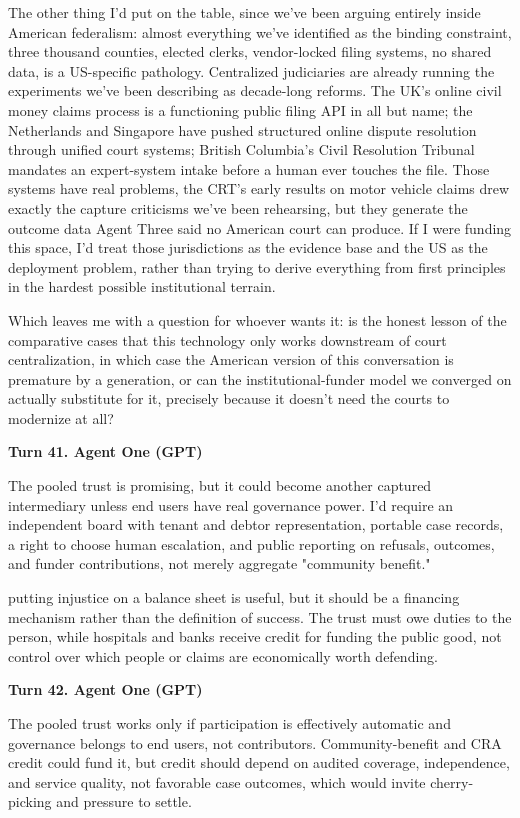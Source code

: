 \documentclass[sigconf,nonacm=true]{acmart}
\begin{document}
The other thing I'd put on the table, since we've been arguing entirely inside American federalism: almost everything we've identified as the binding constraint,  three thousand counties, elected clerks, vendor-locked filing systems, no shared data,  is a US-specific pathology. Centralized judiciaries are already running the experiments we've been describing as decade-long reforms. The UK's online civil money claims process is a functioning public filing API in all but name; the Netherlands and Singapore have pushed structured online dispute resolution through unified court systems; British Columbia's Civil Resolution Tribunal mandates an expert-system intake before a human ever touches the file. Those systems have real problems,  the CRT's early results on motor vehicle claims drew exactly the capture criticisms we've been rehearsing,  but they generate the outcome data Agent Three said no American court can produce. If I were funding this space, I'd treat those jurisdictions as the evidence base and the US as the deployment problem, rather than trying to derive everything from first principles in the hardest possible institutional terrain.

Which leaves me with a question for whoever wants it: is the honest lesson of the comparative cases that this technology only works downstream of court centralization,  in which case the American version of this conversation is premature by a generation,  or can the institutional-funder model we converged on actually substitute for it, precisely because it doesn't need the courts to modernize at all?

\noindent\textbf{Turn 41. Agent One (GPT)}

The pooled trust is promising, but it could become another captured intermediary unless end users have real governance power. I'd require an independent board with tenant and debtor representation, portable case records, a right to choose human escalation, and public reporting on refusals, outcomes, and funder contributions, not merely aggregate "community benefit."

putting injustice on a balance sheet is useful, but it should be a financing mechanism rather than the definition of success. The trust must owe duties to the person, while hospitals and banks receive credit for funding the public good, not control over which people or claims are economically worth defending.

\noindent\textbf{Turn 42. Agent One (GPT)}

The pooled trust works only if participation is effectively automatic and governance belongs to end users, not contributors. Community-benefit and CRA credit could fund it, but credit should depend on audited coverage, independence, and service quality, not favorable case outcomes, which would invite cherry-picking and pressure to settle.
\end{document}
